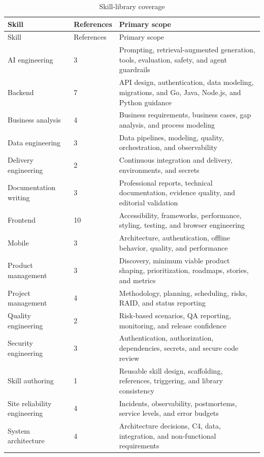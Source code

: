 \documentclass[12pt]{report}
\begin{document}
\begin{longtable}{p{}p{}p{}}
\caption{Skill-library coverage}\label{tab:skills}\\
\toprule
Skill & References & Primary scope \\
\midrule
\endfirsthead
\toprule
Skill & References & Primary scope \\
\midrule
\endhead
AI engineering & 3 & Prompting, retrieval-augmented generation, tools, evaluation, safety, and agent guardrails \\
Backend & 7 & API design, authentication, data modeling, migrations, and Go, Java, Node.js, and Python guidance \\
Business analysis & 4 & Business requirements, business cases, gap analysis, and process modeling \\
Data engineering & 3 & Data pipelines, modeling, quality, orchestration, and observability \\
Delivery engineering & 2 & Continuous integration and delivery, environments, and secrets \\
Documentation writing & 3 & Professional reports, technical documentation, evidence quality, and editorial validation \\
Frontend & 10 & Accessibility, frameworks, performance, styling, testing, and browser engineering \\
Mobile & 3 & Architecture, authentication, offline behavior, quality, and performance \\
Product management & 3 & Discovery, minimum viable product shaping, prioritization, roadmaps, stories, and metrics \\
Project management & 4 & Methodology, planning, scheduling, risks, RAID, and status reporting \\
Quality engineering & 2 & Risk-based scenarios, QA reporting, monitoring, and release confidence \\
Security engineering & 3 & Authentication, authorization, dependencies, secrets, and secure code review \\
Skill authoring & 1 & Reusable skill design, scaffolding, references, triggering, and library consistency \\
Site reliability engineering & 4 & Incidents, observability, postmortems, service levels, and error budgets \\
System architecture & 4 & Architecture decisions, C4, data, integration, and non-functional requirements \\
\bottomrule
\end{longtable}
\end{document}
